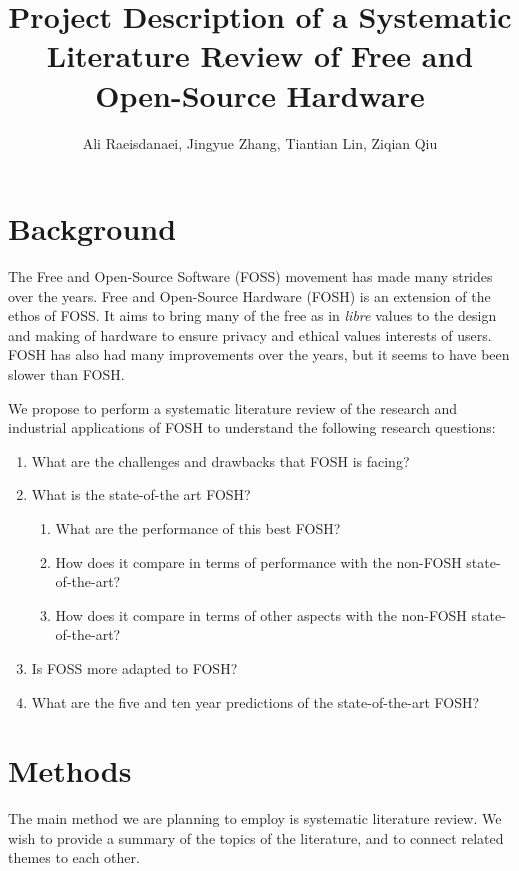 \documentclass{article}
\begin{document}


\title{Project Description of a Systematic Literature Review of Free and Open-Source Hardware}
\author{Ali Raeisdanaei, Jingyue Zhang, Tiantian Lin, Ziqian Qiu }
\date{}
\maketitle

\section{Background}
The Free and Open-Source Software (FOSS) movement has made many strides over the years.
Free and Open-Source Hardware (FOSH) is an extension of the ethos of FOSS.
It aims to bring many of the free as in \textit{libre} values to the design and making of hardware to ensure privacy and ethical values interests of users.
FOSH has also had many improvements over the years, but it seems to have been slower than FOSH.

We propose to perform a systematic literature review of the research and industrial applications of FOSH to understand the following research questions:
\begin{enumerate}
    \item What are the challenges and drawbacks that FOSH is facing?
    \item What is the state-of-the art FOSH?
          \begin{enumerate}
              \item What are the performance of this best FOSH?
              \item How does it compare in terms of performance with the non-FOSH state-of-the-art?
              \item How does it compare in terms of other aspects with the non-FOSH state-of-the-art?
          \end{enumerate}

    \item Is FOSS more adapted to FOSH?
    \item What are the five and ten year predictions of the state-of-the-art FOSH?
\end{enumerate}

\section{Methods}
The main method we are planning to employ is systematic literature review.
We wish to provide a summary of the topics of the literature, and to connect related themes to each other.

\end{document}
